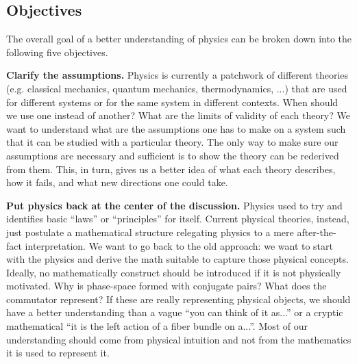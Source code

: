 \documentclass[twocolumn]{article}
\begin{document}
\subsection{Objectives}

The overall goal of a better understanding of physics can be broken down into the following five objectives.

\textbf{Clarify the assumptions.} Physics is currently a patchwork of different theories (e.g. classical mechanics, quantum mechanics, thermodynamics, ...) that are used for different systems or for the same system in different contexts. When should we use one instead of another? What are the limits of validity of each theory? We want to understand what are the assumptions one has to make on a system such that it can be studied with a particular theory. The only way to make sure our assumptions are necessary and sufficient is to show the theory can be rederived from them. This, in turn, gives us a better idea of what each theory describes, how it fails, and what new directions one could take.

\textbf{Put physics back at the center of the discussion.} Physics used to try and identifies basic ``laws'' or ``principles'' for itself. Current physical theories, instead, just postulate a mathematical structure relegating physics to a mere after-the-fact interpretation. We want to go back to the old approach: we want to start with the physics and derive the math suitable to capture those physical concepts. Ideally, no mathematically construct should be introduced if it is not physically motivated. Why is phase-space formed with conjugate pairs? What does the commutator represent? If these are really representing physical objects, we should have a better understanding than a vague ``you can think of it as...'' or a cryptic mathematical ``it is the left action of a fiber bundle on a...''. Most of our understanding should come from physical intuition and not from the mathematics it is used to represent it.
\end{document}
